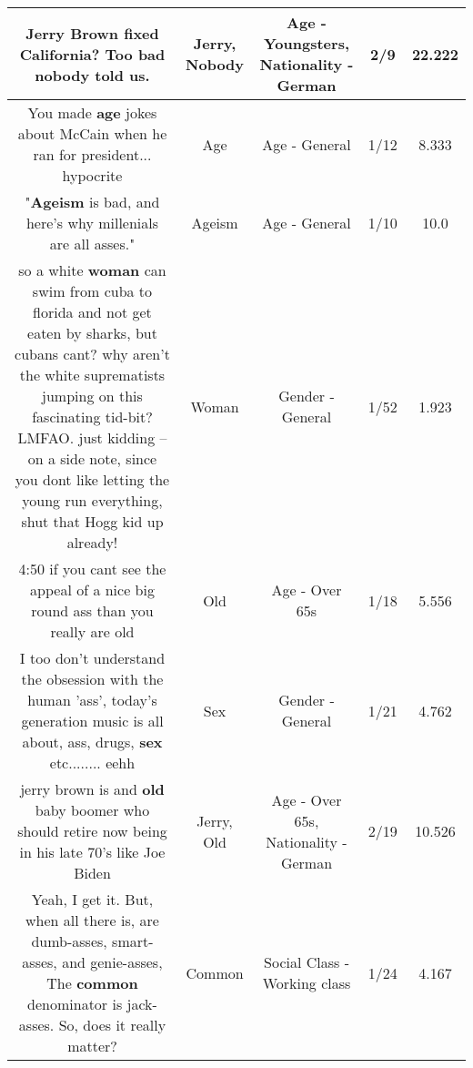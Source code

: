 \documentclass[11pt]{article}
\newlength\mylength
\begin{document}
\begin{center}
\begin{longtable}{|C{.65\mylength}|C{.30\mylength}|C{.12\mylength}|C{.12\mylength}|C{.12\mylength}|}
  \small Jerry Brown fixed California? Too bad \textbf{nobody} told us.\normalsize   & Jerry, Nobody & Age - Youngsters, Nationality - German & 2/9 & 22.222 \\  \hline
  \small You made \textbf{age} jokes about McCain when he ran for president... hypocrite\normalsize   & Age & Age - General & 1/12 & 8.333 \\  \hline
  \small "\textbf{Ageism} is bad, and here's why millenials are all asses."\normalsize   & Ageism & Age - General & 1/10 & 10.0 \\  \hline
  \small so a white \textbf{woman} can swim from cuba to florida and not get eaten by sharks, but cubans cant? why aren't the white suprematists jumping on this fascinating tid-bit? LMFAO. just kidding -- on a side note, since you dont like letting the young run everything, shut that Hogg kid up already!\normalsize   & Woman & Gender - General & 1/52 & 1.923 \\  \hline
  \small 4:50 if you cant see the appeal of a nice big round ass than you really are old\normalsize   & Old & Age - Over 65s & 1/18 & 5.556 \\  \hline
  \small I too don't understand the obsession with  the human 'ass', today's generation music is all about, ass, drugs, \textbf{sex}  etc........ eehh\normalsize   & Sex & Gender - General & 1/21 & 4.762 \\  \hline
  \small jerry brown is and \textbf{old} baby boomer who should retire now being in his late 70's like Joe Biden\normalsize   & Jerry, Old & Age - Over 65s, Nationality - German & 2/19 & 10.526 \\  \hline
  \small Yeah, I get it. But, when all there is, are dumb-asses, smart-asses, and genie-asses, The \textbf{common} denominator is jack-asses. So, does it really matter?\normalsize   & Common & Social Class - Working class & 1/24 & 4.167 \\  \hline

\end{longtable}
\end{center}
\end{document}
